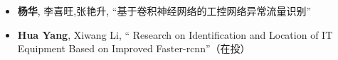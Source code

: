 %
%



\begin{itemize}
	\item \textbf{杨华}, 李喜旺,张艳升, ``基于卷积神经网络的工控网络异常流量识别''\\
	 { \footnotesize {}}
	\item \textbf{Hua Yang}, Xiwang Li, ``
Research on Identification and Location of IT Equipment Based on Improved Faster-rcnn''（在投） \\
	 { \footnotesize {}}
\end{itemize}
